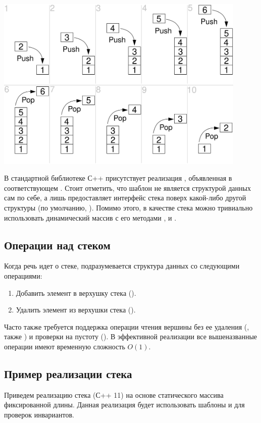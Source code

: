 \includegraphics[width=0.9\textwidth]{resources/19-26/stack.png}

В стандартной библиотеке С++ присутствует реализация , объявленная в соответствующем
. Стоит отметить, что шаблон  не является
структурой данных сам по себе, а лишь предоставляет интерфейс стека поверх какой-либо другой структуры (по умолчанию, ).
Помимо этого, в качестве стека можно тривиально использовать динамический массив  с его
методами ,  и .
\subsection{Операции над стеком}
Когда речь идет о стеке, подразумевается структура данных со следующими операциями:
\begin{enumerate}
  \item Добавить элемент в верхушку стека ().
  \item Удалить элемент из верхушки стека ().
\end{enumerate}

Часто также требуется поддержка операции чтения вершины без ее удаления (, также ) и
проверки на пустоту (). В эффективной реализации все вышеназванные операции имеют временную сложность
\(O(1)\).

\subsection{Пример реализации стека}
Приведем реализацию стека (С++ 11) на основе статического массива фиксированной длины. Данная реализация будет использовать шаблоны и
 для проверок инвариантов.

